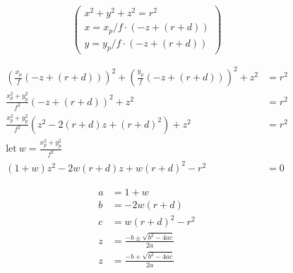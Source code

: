 \documentclass{article}
\begin{document}
\[ %
\begin{pmatrix}
x^2 + y^2 + z^2 = r^2 \\
x = x_p / f \cdot (-z + (r + d)) \\
y = y_p / f \cdot (-z + (r + d))
\end{pmatrix}
\]

\[ %
\begin{aligned}
\left(\frac{x_p}{f} (-z + (r + d)) \right)^2 +
  \left(\frac{y_p}{f} (-z + (r + d)) \right)^2 + z^2 &= r^2 \\
\frac{x_p^2 + y_p^2}{f^2} (-z + (r + d))^2 + z^2 &= r^2 \\
\frac{x_p^2 + y_p^2}{f^2} (z^2 - 2(r + d)z + (r + d)^2) + z^2 &= r^2 \\
\text{let} \ w = \frac{x_p^2 + y_p^2}{f^2} \\
(1 + w) z^2 - 2w(r + d)z + w(r + d)^2 - r^2 &= 0
\end{aligned}
\]

\[ %
\begin{aligned}
a &= 1 + w \\
b &= -2w(r + d) \\
c &= w(r + d)^2 - r^2 \\
z &= \frac{-b \pm \sqrt{b^2 - 4ac}}{2a} \\
z &= \frac{-b + \sqrt{b^2 - 4ac}}{2a}
\end{aligned}
\]
\end{document}
